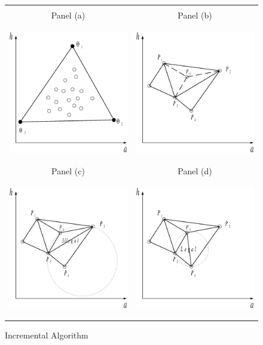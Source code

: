 \documentclass[a4paper,12pt]{article}%
\begin{document}
\begin{figure}[htb] \centering
\caption{Incremental Algorithm}
\begin{tabular}
[c]{cc}
& \\
Panel (a) & Panel (b) \\
{\includegraphics[height=6.0cm, width=6.0cm]{Abbildungen/Incremental_0.eps}} &
{\includegraphics[height=6.0cm, width=6.0cm]{Abbildungen/Incremental_1.eps}} \\
Panel (c) & Panel (d) \\
{\includegraphics[height=6.0cm, width=6.0cm]{Abbildungen/Incremental_2.eps}} &
{\includegraphics[height=6.0cm, width=6.0cm]{Abbildungen/Incremental_3.eps}} \\

\end{tabular}
\end{figure}
\end{document}
